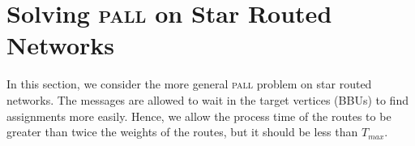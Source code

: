 \documentclass[10pt, conference, letterpaper]{IEEEtran}
\newcommand\pall{\textsc{pall}\xspace}
\begin{document}
%
%      
%     
    
    
         \section{Solving \pall on Star Routed Networks}\label{sec:PALL}
    In this section, we consider the more general \pall problem on star routed networks. The messages are allowed to wait in the target vertices (BBUs) to find assignments more easily. Hence, we allow the process time of the routes to be greater than twice the weights of the routes, but it should be less than $T_{max}$.
\end{document}
